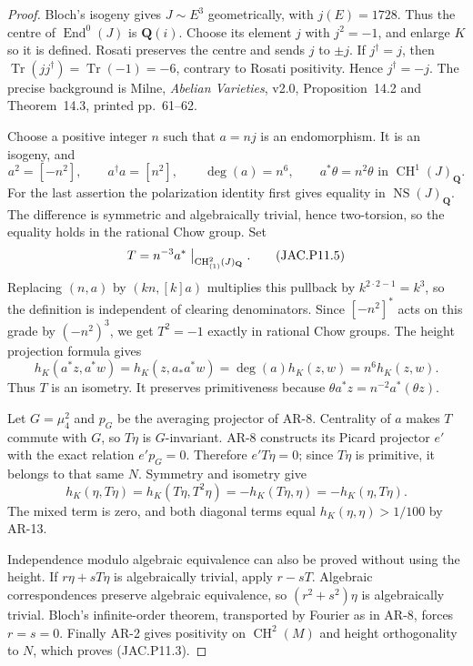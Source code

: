 \documentclass[11pt,a4paper]{article}
\begin{document}
\begin{proof}
Bloch's isogeny gives $J\sim E^3$ geometrically, with $j(E)=1728$.
Thus the centre of $\operatorname{End}^0(J)$ is $\mathbf Q(i)$.
Choose its element $j$ with $j^2=-1$, and enlarge $K$ so it is
defined. Rosati preserves the centre and sends $j$ to $\pm j$.
If $j^\dagger=j$, then
$\operatorname{Tr}(j j^\dagger)=\operatorname{Tr}(-1)=-6$,
contrary to Rosati positivity. Hence $j^\dagger=-j$.
The precise background is Milne, \emph{Abelian Varieties}, v2.0,
Proposition~14.2 and Theorem~14.3, printed pp.~61--62.

Choose a positive integer $n$ such that $a=nj$ is an endomorphism.
It is an isogeny, and
\[
 a^2=[-n^2],\qquad a^\dagger a=[n^2],\qquad
 \deg(a)=n^6,\qquad a^*\theta=n^2\theta
     \text{ in }\operatorname{CH}^1(J)_{\mathbf Q}.     \tag{JAC.P11.4}
\]
For the last assertion the polarization identity first gives
equality in $\operatorname{NS}(J)_{\mathbf Q}$. The difference is
symmetric and algebraically trivial, hence two-torsion, so the
equality holds in the rational Chow group.
Set
\[
 T=n^{-3}a^*\bigm|_{\operatorname{CH}^2_{(1)}(J)_{\mathbf Q}}.
                                                        \tag{JAC.P11.5}
\]
Replacing $(n,a)$ by $(kn,[k]a)$ multiplies this pullback by
$k^{2\cdot2-1}=k^3$, so the definition is independent of clearing
denominators. Since $[-n^2]^*$ acts on this grade by
$(-n^2)^3$, we get $T^2=-1$ exactly in rational Chow groups.
The height projection formula gives
\[
 h_K(a^*z,a^*w)=h_K(z,a_*a^*w)=\deg(a)h_K(z,w)
              =n^6h_K(z,w).
\]
Thus $T$ is an isometry. It preserves primitiveness because
$\theta a^*z=n^{-2}a^*(\theta z)$.

Let $G=\mu_4^2$ and $p_G$ be the averaging projector of AR-8.
Centrality of $a$ makes $T$ commute with $G$, so $T\eta$ is
$G$-invariant. AR-8 constructs its Picard projector $e'$ with
the exact relation $e'p_G=0$. Therefore $e'T\eta=0$; since $T\eta$
is primitive, it belongs to that same $N$.
Symmetry and isometry give
\[
 h_K(\eta,T\eta)=h_K(T\eta,T^2\eta)
               =-h_K(T\eta,\eta)=-h_K(\eta,T\eta).
\]
The mixed term is zero, and both diagonal terms equal
$h_K(\eta,\eta)>1/100$ by AR-13.

Independence modulo algebraic equivalence can also be proved
without using the height. If $r\eta+sT\eta$ is algebraically
trivial, apply $r-sT$. Algebraic correspondences preserve
algebraic equivalence, so $(r^2+s^2)\eta$ is algebraically trivial.
Bloch's infinite-order theorem, transported by Fourier as in AR-8,
forces $r=s=0$. Finally AR-2 gives positivity on
$\operatorname{CH}^2(M)$ and height orthogonality to $N$,
which proves (JAC.P11.3).
\end{proof}
\end{document}
